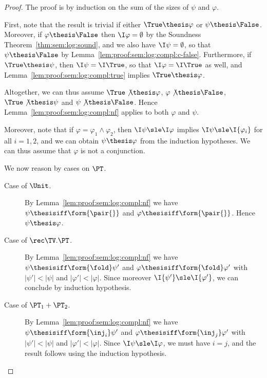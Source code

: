 \begin{proof}
The proof is by induction on the sum of the 
sizes of $\psi$ and $\varphi$.

First, note that the result is trivial if either
$\True \thesis \varphi$
or $\psi \thesis \False$.
%
Moreover, if $\varphi \thesis \False$
then $\I\varphi = \emptyset$ by the Soundness Theorem~\ref{thm:sem:log:sound},
and we also have $\I\psi = \emptyset$,
so that $\psi \thesis \False$
by Lemma~\ref{lem:proof:sem:log:compl:c-false}.
%
Furthermore, if $\True \thesis \psi$,
then $\I\psi = \I\True$,
so that $\I\varphi = \I\True$ as well,
and Lemma~\ref{lem:proof:sem:log:compl:true}
implies $\True \thesis \varphi$.

Altogether, we can thus assume
$\True \not\thesis \varphi$,
$\varphi \not\thesis \False$,
$\True \not\thesis \psi$
and
$\psi \not\thesis \False$.
Hence Lemma~\ref{lem:proof:sem:log:compl:nf}
applies to both $\varphi$ and $\psi$.

Moreover, note that if $\varphi = \varphi_1 \land \varphi_2$,
then $\I\psi \sle \I\varphi$ implies
$\I\psi \sle \I{\varphi_i}$ for all $i = 1,2$,
and we can obtain $\psi \thesis \varphi$ from the induction hypotheses.
%
We can thus assume that $\varphi$ is not a conjunction.

We now reason by cases on $\PT$.
\begin{description}
\item[Case of $\Unit$.]
By Lemma~\ref{lem:proof:sem:log:compl:nf}
we have
$\psi \thesisiff \form{\pair{}}$
and $\varphi \thesisiff \form{\pair{}}$.
Hence $\psi \thesis \varphi$.

\item[Case of $\rec \TV.\PT$.]
By Lemma~\ref{lem:proof:sem:log:compl:nf}
we have
$\psi \thesisiff \form{\fold} \psi'$
and $\varphi \thesisiff \form{\fold} \varphi'$
with $|\psi'| < |\psi|$
and $|\varphi'| < |\varphi|$.
%
Since moreover $\I{\psi'} \sle \I{\varphi'}$,
we can conclude by induction hypothesis.

\item[Case of $\PT_1 + \PT_2$.]
By Lemma~\ref{lem:proof:sem:log:compl:nf}
we have
$\psi \thesisiff \form{\inj_i} \psi'$
and $\varphi \thesisiff \form{\inj_j} \varphi'$
with $|\psi'| < |\psi|$
and $|\varphi'| < |\varphi|$.
%
Since $\I\psi \sle \I\varphi$,
we must have $i = j$,
and the result follows using the induction hypothesis.


\end{description}
\end{proof}
